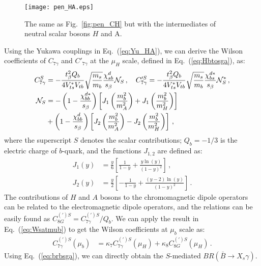 \documentclass[prd,preprint,superscriptaddress,amsmath,amssymb]{revtex4}
\begin{document}
\begin{figure}[phtb]
\texttt{[image: pen\_HA.eps]}
\caption{The same as Fig.~\ref{fig:pen_CH} but with the intermediates of neutral scalar bosons $H$ and A.  }
\label{fig:pen_S}
\end{figure} 

Using the Yukawa couplings in Eq.~(\ref{eq:Yu_HA}), we can derive the Wilson coefficients of $C_{7\gamma}$ and $C'_{7\gamma}$ at  the $\mu_H$ scale, defined in Eq.~(\ref{eq:Hbtosga}), as:
%
 \begin{align}
 C^S_{7\gamma} & = -\frac{t^2_\beta Q_b}{4 V^*_{ts} V_{tb}} \sqrt{\frac{m_s}{m_b}}  \frac{\chi^d_{sb}}{s_\beta} {\cal N}_{S}  \,, \quad C'^S_{7\gamma} = -\frac{t^2_\beta Q_b}{4 V^*_{ts} V_{tb}} \sqrt{\frac{m_s}{m_b}} \frac{\chi^{d*}_{bs} }{s_\beta} {\cal N}^*_{S} \,, \label{eq:C7S} \\
 {\cal N}_{S} & = - \left( 1 -\frac{\chi^{d*}_{bb}}{s_\beta}\right)  \left[ J_1 \left( \frac{m^2_b}{m^2_A}\right)+ J_1 \left( \frac{m^2_b}{m^2_H}\right)\right] \nonumber \\
 & + \left( 1 -\frac{\chi^{d}_{bb}}{s_\beta}\right)  \left[ J_2 \left( \frac{m^2_b}{m^2_A}\right)- J_2\left( \frac{m^2_b}{m^2_H}\right)\right]\,, \label{eq:NS}
 \end{align}
where the superscript $S$ denotes the scalar contributions; $Q_b=-1/3$ is the electric charge of $b$-quark, and the functions $J_{1,2}$ are defined as:
 \begin{align}
 J_{1}(y) &= \frac{y}{6} \left[ \frac{1}{1-y} + \frac{y \ln(y)}{(1-y)^2} \right] \,, \nonumber \\
 J_2(y) & = \frac{y}{2} \left[ -\frac{1}{1-y} + \frac{(y-2) \ln(y)}{(1-y)^2}\right]\,.
 \end{align}
  The contributions of $H$ and $A$ bosons to the chromomagnetic dipole operators can be related to the electromagnetic dipole operators, and the relations can be easily found as $C^{(\prime)S}_{8G} = C^{(\prime)S}_{7\gamma}/Q_b$.
 We can apply the result in Eq.~(\ref{eq:Wsatmub}) to get the Wilson coefficients at $\mu_b$ scale as:
 \begin{align}
 C^{(\prime) S}_{7\gamma} (\mu_b) & =  \kappa_7 C^{(\prime)S}_{7\gamma} (\mu_H) + \kappa_8 C^{(\prime)S}_{8G}(\mu_H)\,.
 \end{align}
Using Eq.~(\ref{eq:brbsga}), we can directly obtain the $S$-mediated $BR(\bar B \to X_s \gamma)$.
  
\end{document}
